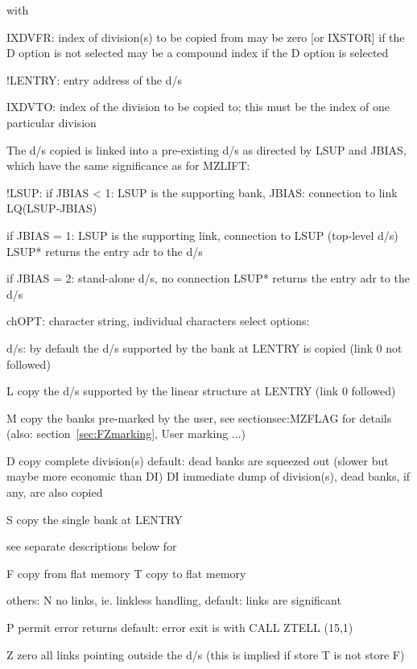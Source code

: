 with
\begin{XMP}
     IXDVFR:  index of division(s) to be copied from
               may be zero [or IXSTOR] if the D option is not selected
               may be a compound index if the D option is selected

    !LENTRY:  entry address of the d/s

     IXDVTO:  index of the division to be copied to;
               this must be the index of one particular division

            The d/s copied is linked into a pre-existing d/s
            as directed by LSUP and JBIAS, which have the same
            significance as for MZLIFT:

      !LSUP:  if JBIAS < 1: LSUP is the supporting bank,
      JBIAS:                 connection to link LQ(LSUP-JBIAS)

               if JBIAS = 1: LSUP is the supporting link,
                              connection to LSUP (top-level d/s)
                              LSUP* returns the entry adr to the d/s

               if JBIAS = 2: stand-alone d/s, no connection
                              LSUP* returns the entry adr to the d/s

      chOPT:  character string,
               individual characters select options:

            d/s:    by default the d/s supported by the bank at
                     LENTRY is copied (link 0 not followed)

                   L copy the d/s supported by the linear structure
                     at LENTRY (link 0 followed)

                   M  copy the banks pre-marked by the user,
                      see section{sec:MZFLAG} for details
                      (also: section~\ref{sec:FZmarking}, User marking ...)

                   D  copy complete division(s)
                      default: dead banks are squeezed out
                               (slower but maybe more economic than DI)
                   DI immediate dump of division(s),
                      dead banks, if any, are also copied

                   S copy the single bank at LENTRY

                    see separate descriptions below for

                   F   copy from flat memory
                   T   copy   to flat memory

         others:   N no links, ie. linkless handling,
                     default: links are significant

                   P permit error returns
                     default: error exit is with CALL ZTELL (15,1)

                   Z zero all links pointing outside the d/s
                     (this is implied if store T is not store F)
\end{XMP} 

